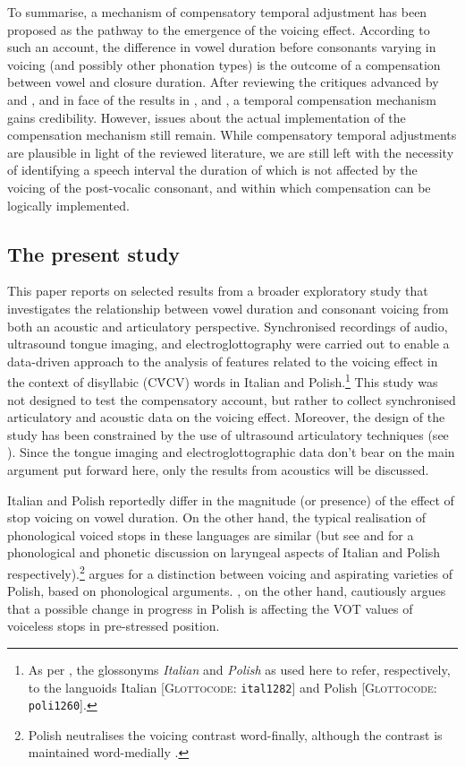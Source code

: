\documentclass[charis]{glossa}
\begin{document}
To summarise, a mechanism of compensatory temporal adjustment has been
proposed as the pathway to the emergence of the voicing effect.
According to such an account, the difference in vowel duration before
consonants varying in voicing (and possibly other phonation types) is
the outcome of a compensation between vowel and closure duration. After
reviewing the critiques advanced by \citet{chen1970} and
\citet{maddieson1976}, and in face of the results in \citet{slis1969},
\citet{de-jong1991} and \citet{begus2017}, a temporal compensation
mechanism gains credibility. However, issues about the actual
implementation of the compensation mechanism still remain. While
compensatory temporal adjustments are plausible in light of the reviewed
literature, we are still left with the necessity of identifying a speech
interval the duration of which is not affected by the voicing of the
post-vocalic consonant, and within which compensation can be logically
implemented.

\hypertarget{the-present-study}{%
\subsection{The present study}\label{the-present-study}}

This paper reports on selected results from a broader exploratory study
that investigates the relationship between vowel duration and consonant
voicing from both an acoustic and articulatory perspective. Synchronised
recordings of audio, ultrasound tongue imaging, and electroglottography
were carried out to enable a data-driven approach to the analysis of
features related to the voicing effect in the context of disyllabic
(CV́CV) words in Italian and
Polish.\footnote{As per \citet{cysouw2013}, the glossonyms \textit{Italian} and \textit{Polish} as used here to refer, respectively, to the languoids Italian [\textsc{Glottocode}: \texttt{ital1282}] and Polish [\textsc{Glottocode}: \texttt{poli1260}].}
This study was not designed to test the compensatory account, but rather
to collect synchronised articulatory and acoustic data on the voicing
effect. Moreover, the design of the study has been constrained by the
use of ultrasound articulatory techniques (see ). Since
the tongue imaging and electroglottographic data don't bear on the main
argument put forward here, only the results from acoustics will be
discussed.

Italian and Polish reportedly differ in the magnitude (or presence) of
the effect of stop voicing on vowel duration. On the other hand, the
typical realisation of phonological voiced stops in these languages are
similar (but see \citealt{huszthy2016} and \citealt{schwartz2018} for a
phonological and phonetic discussion on laryngeal aspects of Italian and
Polish
respectively).\footnote{Polish neutralises the voicing contrast word-finally, although the contrast is maintained word-medially \citep{gussmann2007}.}
\citet{cyran2011} argues for a distinction between voicing and
aspirating varieties of Polish, based on phonological arguments.
\citet{waniek2011}, on the other hand, cautiously argues that a possible
change in progress in Polish is affecting the VOT values of voiceless
stops in pre-stressed position.
\end{document}
